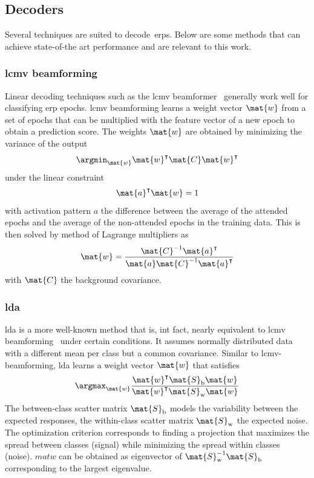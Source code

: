 \subsection{Decoders}
Several techniques are suited to decode~\ac{erps}.
Below are some methods that can achieve state-of-the art performance and are
relevant to this work.

\subsubsection{\Acs{lcmv} beamforming}
Linear decoding techniques such as the \ac{lcmv}
beamformer~\cite{Wittevrongel2016} generally work well for
classifying \ac{erp} epochs.
\Ac{lcmv} beamforming learns a weight vector $\mat{w}$ from a set of epochs that can
be multiplied with the feature vector of a new epoch to obtain a prediction
score.
The weights $\mat{w}$ are obtained by minimizing the variance of the output
\begin{equation}
  \argmin_\mat{w}\mat{w}^\intercal\mat{C}
	\mat{w}^\intercal
\end{equation}
under the linear constraint
\begin{equation}
	\mat{a}^\intercal\mat{w} = 1
\end{equation}
with activation pattern $a$ the difference between the average of the attended epochs and the
average of the non-attended epochs in the training data.
This is then solved by  method of Lagrange multipliers as
\begin{equation}
	\mat{w} =
  \frac{\mat{C}^{-1}\mat{a}^\intercal}
  {\mat{a}\mat{C}^{-1}\mat{a}^\intercal}
\end{equation}
with $\mat{C}$ the background covariance.

\subsubsection{\Ac{lda}}
\Ac{lda} is a more well-known method that is, int fact, nearly equivalent to
\ac{lcmv} beamforming~\cite{Treder2016} under certain conditions.
It assumes normally distributed data with a different mean per class but a
common covariance.
Similar to \ac{lcmv}-beamforming, \ac{lda} learns a weight vector $\mat{w}$
that satisfies
\begin{equation}
  \argmax_\mat{w}\frac{\mat{w}^\intercal\mat{S}_\text{b}\mat{w}}{\mat{w}^\intercal\mat{S}_\text{w}\mat{w}}
\end{equation}
The between-class scatter matrix $\mat{S}_\text{b}$ models the variability
between the expected responses, the within-class scatter matrix
$\mat{S}_\text{w}$ the expected noise.
The optimization criterion corresponds to finding a projection that maximizes
the spread between classes (signal) while minimizing the spread within classes
(noise).
$mat{w}$ can be obtained as eigenvector of
$\mat{S}_\text{w}^{-1}\mat{S}_\text{b}$ corresponding to the largest eigenvalue.

